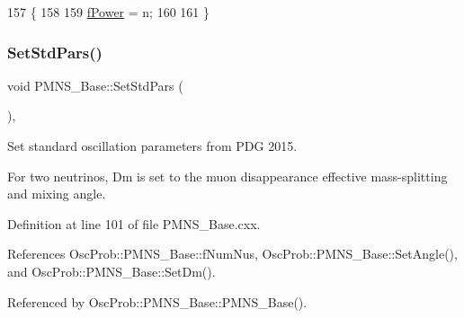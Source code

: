 \begin{DoxyCode}
157 \{
158 
159   \hyperlink{classOscProb_1_1PMNS__Deco_a19fdcdf9a8b2bd9677f72ca1fd77dc3e}{fPower} = n;
160   
161 \}
\end{DoxyCode}
\mbox{\label{classOscProb_1_1PMNS__Base_a4de96ac9b6d1e9b029ab877e57d211ad}} 
\subsubsection{\texorpdfstring{Set\+Std\+Pars()}{SetStdPars()}}
{\footnotesize\ttfamily void P\+M\+N\+S\+\_\+\+Base\+::\+Set\+Std\+Pars (\begin{DoxyParamCaption}{ }\end{DoxyParamCaption})\hspace{0.3cm}{\ttfamily [virtual]}, {\ttfamily [inherited]}}

Set standard oscillation parameters from P\+DG 2015.

For two neutrinos, Dm is set to the muon disappearance effective mass-\/splitting and mixing angle. 

Definition at line 101 of file P\+M\+N\+S\+\_\+\+Base.\+cxx.



References Osc\+Prob\+::\+P\+M\+N\+S\+\_\+\+Base\+::f\+Num\+Nus, Osc\+Prob\+::\+P\+M\+N\+S\+\_\+\+Base\+::\+Set\+Angle(), and Osc\+Prob\+::\+P\+M\+N\+S\+\_\+\+Base\+::\+Set\+Dm().



Referenced by Osc\+Prob\+::\+P\+M\+N\+S\+\_\+\+Base\+::\+P\+M\+N\+S\+\_\+\+Base().


